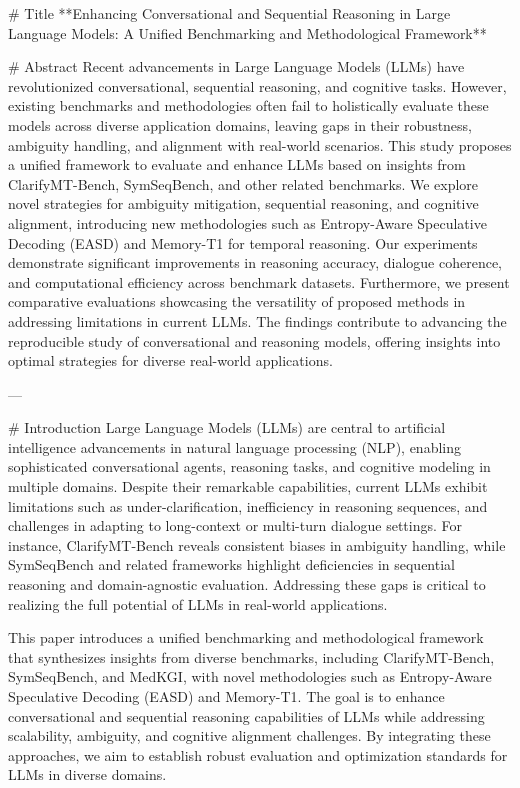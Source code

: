 # Title  
**Enhancing Conversational and Sequential Reasoning in Large Language Models: A Unified Benchmarking and Methodological Framework**

# Abstract  
Recent advancements in Large Language Models (LLMs) have revolutionized conversational, sequential reasoning, and cognitive tasks. However, existing benchmarks and methodologies often fail to holistically evaluate these models across diverse application domains, leaving gaps in their robustness, ambiguity handling, and alignment with real-world scenarios. This study proposes a unified framework to evaluate and enhance LLMs based on insights from ClarifyMT-Bench, SymSeqBench, and other related benchmarks. We explore novel strategies for ambiguity mitigation, sequential reasoning, and cognitive alignment, introducing new methodologies such as Entropy-Aware Speculative Decoding (EASD) and Memory-T1 for temporal reasoning. Our experiments demonstrate significant improvements in reasoning accuracy, dialogue coherence, and computational efficiency across benchmark datasets. Furthermore, we present comparative evaluations showcasing the versatility of proposed methods in addressing limitations in current LLMs. The findings contribute to advancing the reproducible study of conversational and reasoning models, offering insights into optimal strategies for diverse real-world applications.

---

# Introduction  
Large Language Models (LLMs) are central to artificial intelligence advancements in natural language processing (NLP), enabling sophisticated conversational agents, reasoning tasks, and cognitive modeling in multiple domains. Despite their remarkable capabilities, current LLMs exhibit limitations such as under-clarification, inefficiency in reasoning sequences, and challenges in adapting to long-context or multi-turn dialogue settings. For instance, ClarifyMT-Bench reveals consistent biases in ambiguity handling, while SymSeqBench and related frameworks highlight deficiencies in sequential reasoning and domain-agnostic evaluation. Addressing these gaps is critical to realizing the full potential of LLMs in real-world applications.

This paper introduces a unified benchmarking and methodological framework that synthesizes insights from diverse benchmarks, including ClarifyMT-Bench, SymSeqBench, and MedKGI, with novel methodologies such as Entropy-Aware Speculative Decoding (EASD) and Memory-T1. The goal is to enhance conversational and sequential reasoning capabilities of LLMs while addressing scalability, ambiguity, and cognitive alignment challenges. By integrating these approaches, we aim to establish robust evaluation and optimization standards for LLMs in diverse domains.

